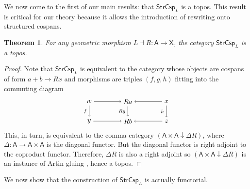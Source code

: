 \documentclass{amsart}
\newcommand{\A}{\cat{A}}
\newcommand{\X}{\cat{X}}
\newcommand{\StrCsp}{\cat{StrCsp}}
\newcommand{\cat}[1]{\mathsf{#1}}
\newcommand{\from}{\colon}
\newcommand{\csp}[3]{#1 + #3 \to #2}
\newtheorem{theorem}{Theorem}[section]
\theoremstyle{remark}
\theoremstyle{definition}
\begin{document}

We now come to the first of our main results: that $ \StrCsp_L $ is a
topos. This result is critical for our theory because it allows the
introduction of rewriting onto structured cospans.

\begin{theorem}
\label{thm:strcsp-istopos}
For any geometric morphism $ L \dashv R \from \A \to \X $, the
category $ \StrCsp_L $ is a topos.
\end{theorem}

\begin{proof}
  Note that $ \StrCsp_L $ is equivalent to the category whose objects
  are cospans of form
  \(
    \csp{a}{Rx}{b}
  \)
  and morphisms are triples $ ( f,g,h ) $ fitting into the commuting
  diagram
  \[
    \begin{tikzpicture}
      \node (1) at (-2,1) {\( w \)};
      \node (2) at (0,1) {\( Ra \)};
      \node (3) at (2,1) {\( x \)};
      \node (4) at (-2,0) {\( y \)};
      \node (5) at (0,0) {\( Rb \)};
      \node (6) at (2,0) {\( z \)};
      \draw [->] (1) to  node [] {\scriptsize{\(  \)}} (2);
      \draw [->] (3) to node [] {\scriptsize{\(  \)}} (2);
      \draw [->] (4) to node [] {\scriptsize{\(  \)}} (5);
      \draw [->] (6) to node [] {\scriptsize{\(  \)}} (5);
      \draw [->] (1) to node [left] {\scriptsize{\( f \)}} (4);
      \draw [->] (2) to node [left] {\scriptsize{\( Rg \)}} (5);
      \draw [->] (3) to node [left] {\scriptsize{\( h \)}} (6); 
    \end{tikzpicture}
  \]
  This, in turn, is equivalent to the comma category
  $ ( \A \times \A \downarrow \Delta R ) $, where
  $ \Delta \from \A \to \A \times \A $ is the diagonal functor. But
  the diagonal functor is right adjoint to the coproduct
  functor. Therefore, $ \Delta R $ is also a right adjoint so
  $ ( \A \times \A \downarrow \Delta R ) $ is an instance of Artin
  gluing \cite{Wraith_ArtinGlue}, hence a topos.
\end{proof}

We now show that the construction of $ \StrCsp_L $ is actually functorial.
\end{document}
